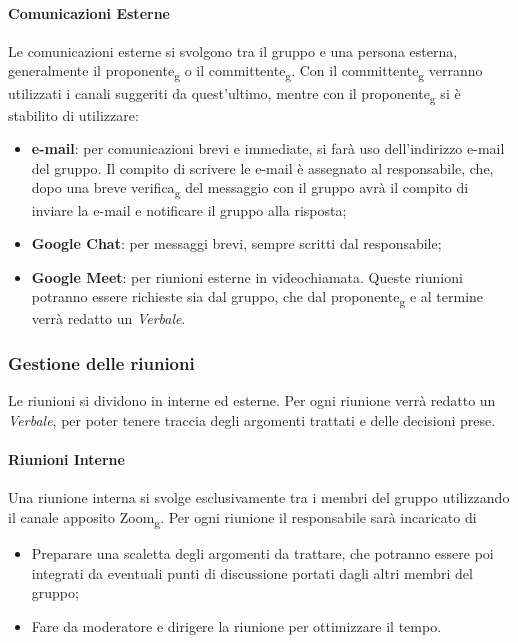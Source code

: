 \paragraph{Comunicazioni Esterne}
Le comunicazioni esterne si svolgono tra il gruppo e una persona esterna, generalmente il proponente\textsubscript{g} o il committente\textsubscript{g}. Con il 
committente\textsubscript{g} verranno utilizzati i canali suggeriti da quest'ultimo, mentre con il proponente\textsubscript{g} si è stabilito di utilizzare:
 \begin{itemize}
    \item \textbf{e-mail}: per comunicazioni brevi e immediate, si farà uso dell'indirizzo e-mail del gruppo. Il compito di scrivere le e-mail è assegnato al 
    responsabile, che, dopo una breve verifica\textsubscript{g} del messaggio con il gruppo avrà il compito di inviare la e-mail e notificare il gruppo alla risposta;
    \item \textbf{Google Chat}: per messaggi brevi, sempre scritti dal responsabile;
    \item \textbf{Google Meet}: per riunioni esterne in videochiamata. Queste riunioni potranno essere 
    richieste sia dal gruppo, che dal proponente\textsubscript{g} e al termine verrà redatto un \textit{Verbale}. 
\end{itemize}

\subsubsection{Gestione delle riunioni}
Le riunioni si dividono in interne ed esterne. Per ogni riunione verrà redatto un \textit{Verbale}, per poter tenere traccia 
degli argomenti trattati e delle decisioni prese.

\paragraph{Riunioni Interne}
Una riunione interna si svolge esclusivamente tra i membri del gruppo utilizzando il canale apposito Zoom\textsubscript{g}. Per ogni riunione 
il responsabile sarà incaricato di 
\begin{itemize}
    \item Preparare una scaletta degli argomenti da trattare, che potranno essere poi integrati da 
    eventuali punti di discussione portati dagli altri membri del gruppo;
    \item Fare da moderatore e dirigere la riunione per ottimizzare il tempo.
\end{itemize}

